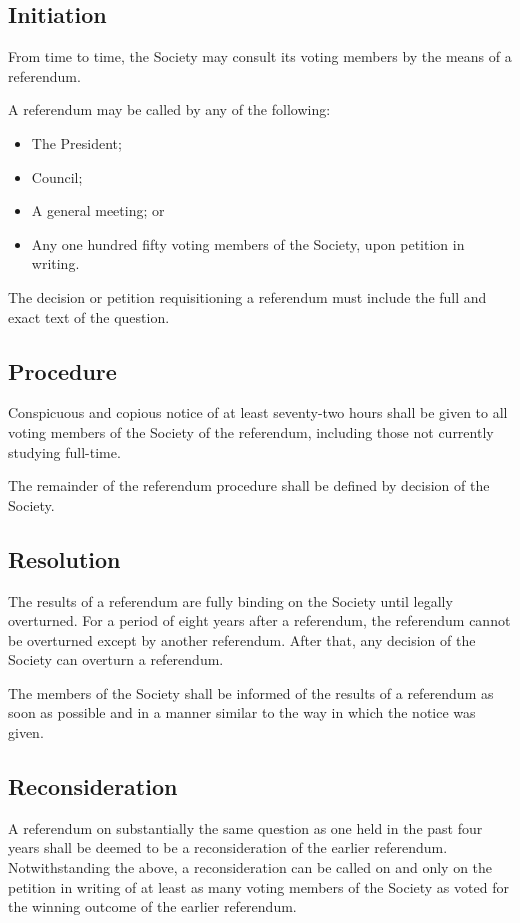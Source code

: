 \subsection{Initiation}
From time to time, the Society may consult its voting members by the means of a
referendum.

A referendum may be called by any of the following:
\begin{itemize}
  \item The President;
  \item Council;
  \item A general meeting; or
  \item Any one hundred fifty voting members of the Society, upon petition in
    writing.
\end{itemize}

The decision or petition requisitioning a referendum must include the full and
exact text of the question.

\subsection{Procedure}
Conspicuous and copious notice of at least seventy-two hours shall be given to
all voting members of the Society of the referendum, including those not
currently studying full-time.

The remainder of the referendum procedure shall be defined by decision of the
Society.

\subsection{Resolution}
The results of a referendum are fully binding on the Society until legally
overturned. For a period of eight years after a referendum, the referendum
cannot be overturned except by another referendum. After that, any decision of
the Society can overturn a referendum.

The members of the Society shall be informed of the results of a referendum as
soon as possible and in a manner similar to the way in which the notice was
given.

\subsection{Reconsideration}
A referendum on substantially the same question as one held in the past four
years shall be deemed to be a reconsideration of the earlier referendum.
Notwithstanding the above, a reconsideration can be called on and only on the
petition in writing of at least as many voting members of the Society as voted
for the winning outcome of the earlier referendum.

